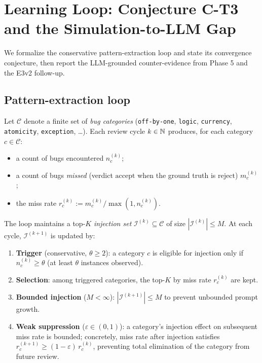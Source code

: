 \section{Learning Loop: Conjecture C-T3 and the Simulation-to-LLM Gap}
\label{sec:learning-loop}

We formalize the conservative pattern-extraction loop and state its convergence conjecture, then report the LLM-grounded counter-evidence from Phase 5 and the E3v2 follow-up.

\subsection{Pattern-extraction loop}

Let $\mathcal{C}$ denote a finite set of \emph{bug categories} (\texttt{off-by-one}, \texttt{logic}, \texttt{currency}, \texttt{atomicity}, \texttt{exception}, \ldots). Each review cycle $k \in \mathbb{N}$ produces, for each category $c \in \mathcal{C}$:
\begin{itemize}[leftmargin=2em]
  \item a count of bugs encountered $n_c^{(k)}$;
  \item a count of bugs \emph{missed} (verdict $\mathrm{accept}$ when the ground truth is $\mathrm{reject}$) $m_c^{(k)}$;
  \item the miss rate $r_c^{(k)} := m_c^{(k)} / \max(1, n_c^{(k)})$.
\end{itemize}

The loop maintains a top-$K$ \emph{injection set} $\mathcal{I}^{(k)} \subseteq \mathcal{C}$ of size $|\mathcal{I}^{(k)}| \le M$. At each cycle, $\mathcal{I}^{(k+1)}$ is updated by:
\begin{enumerate}[leftmargin=2em]
\item \textbf{Trigger} (conservative, $\theta \ge 2$): a category $c$ is eligible for injection only if $n_c^{(k)} \ge \theta$ (at least $\theta$ instances observed).
\item \textbf{Selection}: among triggered categories, the top-$K$ by miss rate $r_c^{(k)}$ are kept.
\item \textbf{Bounded injection} ($M < \infty$): $|\mathcal{I}^{(k+1)}| \le M$ to prevent unbounded prompt growth.
\item \textbf{Weak suppression} ($\varepsilon \in (0,1)$): a category's injection effect on subsequent miss rate is bounded; concretely, miss rate after injection satisfies $r_c^{(k+1)} \ge (1 - \varepsilon)\, r_c^{(k)}$, preventing total elimination of the category from future review.
\end{enumerate}


